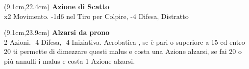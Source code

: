 \documentclass[a4paper,12 pt,openany]{book}
\begin{document}
\begin{textblock*}{6.7cm}(9.1cm,22.4cm) %
\textbf{Azione di Scatto}\\
x2 Movimento. -1d6 nel Tiro per Colpire, -4 Difesa, Distratto
\end{textblock*}

\begin{textblock*}{6.7cm}(9.1cm,23.9cm) %
\textbf{Alzarsi da prono}\\
2 Azioni. -4 Difesa, -4 Iniziativa. Acrobatica , se è pari o superiore a 15 ed entro 20 ti permette di dimezzare questi malus e costa una Azione alzarsi,
se fai 20 o più annulli i malus e costa 1 Azione alzarsi.
\end{textblock*}


	
	~\newpage
	
\end{document}
